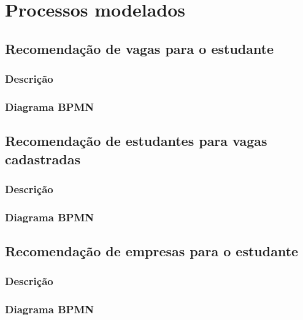 \chapter{Processos modelados}
\section{Recomendação de vagas para o estudante}
\subsection{Descrição}

\subsection{Diagrama BPMN}


\section{Recomendação de estudantes para vagas cadastradas}
\subsection{Descrição}

\subsection{Diagrama BPMN}


\section{Recomendação de empresas para o estudante}
\subsection{Descrição}

\subsection{Diagrama BPMN}

